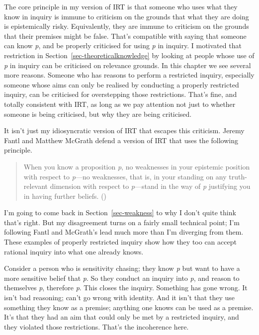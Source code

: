 \documentclass[
  10pt,
  letterpaper,
  twoside]{scrbook}
\begin{document}
The core principle in my version of IRT is that someone who uses what
they know in inquiry is immune to criticism on the grounds that what
they are doing is epistemically risky. Equivalently, they are immune to
criticism on the grounds that their premises might be false. That's
compatible with saying that someone can know \emph{p}, and be properly
criticised for using \emph{p} in inquiry. I motivated that restriction
in Section~\ref{sec-theoreticalknowledge} by looking at people whose use
of \emph{p} in inquiry can be criticised on relevance grounds. In this
chapter we see several more reasons. Someone who has reasons to perform
a restricted inquiry, especially someone whose aims can only be realised
by conducting a properly restricted inquiry, can be criticised for
overstepping those restrictions. That's fine, and totally consistent
with IRT, as long as we pay attention not just to whether someone is
being criticised, but why they are being criticised.

It isn't just my idiosyncratic version of IRT that escapes this
criticism. Jeremy Fantl and Matthew McGrath defend a version of IRT that
uses the following principle.

\begin{quote}
When you know a proposition \emph{p}, no weaknesses in your epistemic
position with respect to \emph{p}---no weaknesses, that is, in your
standing on any truth-relevant dimension with respect to
\emph{p}---stand in the way of \emph{p} justifying you in having further
beliefs. ()
\end{quote}

I'm going to come back in Section~\ref{sec-weakness} to why I don't
quite think that's right. But my disagreement turns on a fairly small
technical point; I'm following Fantl and McGrath's lead much more than
I'm diverging from them. These examples of properly restricted inquiry
show how they too can accept rational inquiry into what one already
knows.

Consider a person who is sensitivity chasing; they know \emph{p} but
want to have a more sensitive belief that \emph{p}. So they conduct an
inquiry into \emph{p}, and reason to themselves \emph{p}, therefore
\emph{p}. This closes the inquiry. Something has gone wrong. It isn't
bad reasoning; can't go wrong with identity. And it isn't that they use
something they know as a premise; anything one knows can be used as a
premise. It's that they had an aim that could only be met by a
restricted inquiry, and they violated those restrictions. That's the
incoherence here.
\end{document}
